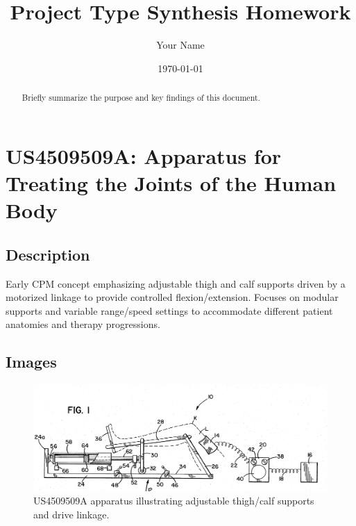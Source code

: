 \documentclass[11pt]{article}
\title{Project Type Synthesis Homework}
\author{Your Name}
\date{\today}
\begin{document}
\maketitle

\begin{abstract}
Briefly summarize the purpose and key findings of this document.
\end{abstract}

\tableofcontents
\newpage

\section{US4509509A: Apparatus for Treating the Joints of the Human Body}
\subsection{Description}
Early CPM concept emphasizing adjustable thigh and calf supports driven by a motorized linkage to provide controlled flexion/extension. Focuses on modular supports and variable range/speed settings to accommodate different patient anatomies and therapy progressions.
\subsection{Images}
\begin{figure}[H]
  \centering
  \includegraphics[width=0.54\linewidth]{US4509509.png}
  \caption{US4509509A apparatus illustrating adjustable thigh/calf supports and drive linkage.}
  \label{fig:US4509509A}
\end{figure}
\end{document}
